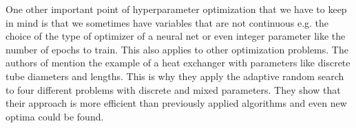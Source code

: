 One other important point of hyperparameter optimization that we have to keep in mind is that we sometimes have variables that are not continuous e.g. the choice of the type of optimizer of a neural net or even integer parameter like the number of epochs to train. This also applies to other optimization problems. The authors of  \cite{kelahan1978application} mention the example of a heat exchanger with parameters like discrete tube diameters and lengths. This is why they apply the adaptive random search to four different problems with discrete and mixed parameters. They show that their approach is more efficient than previously applied algorithms and even new optima could be found.








